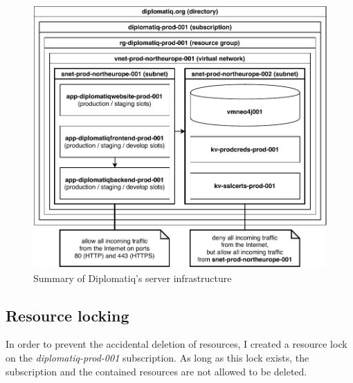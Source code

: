 \begin{figure}[!htb]
    \includegraphics[width=\textwidth]{figures/infrastructure.pdf}
    \caption{Summary of Diplomatiq's server infrastructure}
    \label{fig:infrastructure}
\end{figure}

\subsection{Resource locking}

In order to prevent the accidental deletion of resources, I created a resource lock on the \emph{diplomatiq-prod-001} subscription. As long as this lock exists, the subscription and the contained resources are not allowed to be deleted.
